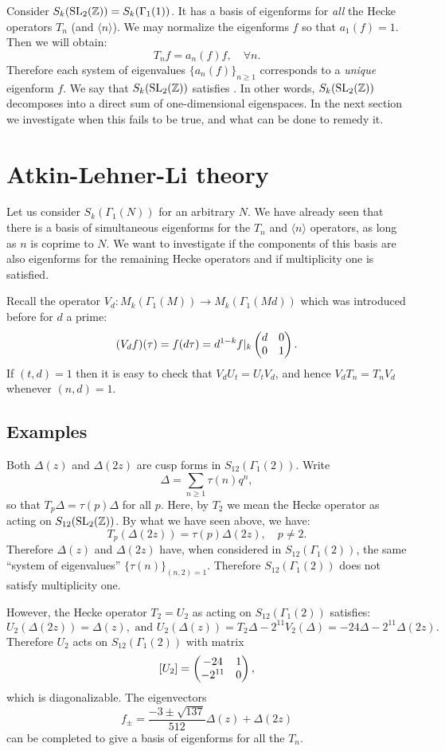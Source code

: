   Consider $S_k(\operatorname{SL}_2(\mathbb{Z})) = S_k(\Gamma_1(1))$. It has a basis of eigenforms for \emph{all} the Hecke operators $T_n$ (and $\langle n\rangle$). We may normalize the eigenforms $f$ so that $a_1(f)=1$. Then we will obtain:
\[
T_n f = a_n(f) f,\quad \forall n.
\]
Therefore each system of eigenvalues $\{a_n(f)\}_{n\geq 1}$ corresponds to a \emph{unique} eigenform $f$. We say that $S_k(\operatorname{SL}_2(\mathbb{Z}))$ satisfies . In other words, $S_k(\operatorname{SL}_2(\mathbb{Z}))$ decomposes into a direct sum of one-dimensional eigenspaces. In the next section we investigate when this fails to be true, and what can be done to remedy it.

\section{Atkin-Lehner-Li theory}
Let us consider $S_k(\Gamma_1(N))$ for an arbitrary $N$. We have already seen that there is a basis of simultaneous eigenforms for the $T_n$ and $\langle n\rangle$ operators, as long as $n$ is coprime to $N$. We want to investigate if the components of this basis are also eigenforms for the remaining Hecke operators and if multiplicity one is satisfied.

Recall the operator $V_d\colon M_k(\Gamma_1(M))\to M_k(\Gamma_1(Md))$ which was introduced before for $d$ a prime:
\[
(V_d f)(\tau) = f(d\tau) = d^{1-k} f|_k\left(\begin{matrix}d&0\\0&1\end{matrix}\right).
\]
If $(t,d)=1$ then it is easy to check that $V_d U_t = U_t V_d$, and hence $V_d T_n = T_n V_d$ whenever $(n,d)=1$.

\subsection{Examples}

  Both $\Delta(z)$ and $\Delta(2z)$ are cusp forms in $S_{12}(\Gamma_1(2))$. Write
\[
\Delta = \sum_{n\geq 1} \tau(n) q^n,
\]
so that $T_p \Delta=\tau(p)\Delta$ for all $p$. Here, by $T_2$ we mean the Hecke operator as acting on $S_{12}(\operatorname{SL}_2(\mathbb{Z}))$. By what we have seen above, we have:
\[
T_p(\Delta(2z)) = \tau(p)\Delta(2z),\quad p\neq 2.
\]
Therefore $\Delta(z)$ and $\Delta(2z)$ have, when considered in $S_{12}(\Gamma_1(2))$, the same ``system of eigenvalues'' $\{\tau(n)\}_{(n,2)=1}$. Therefore $S_{12}(\Gamma_1(2))$ does not satisfy multiplicity one.

However, the Hecke operator $T_2=U_2$ as acting on $S_{12}(\Gamma_1(2))$ satisfies:
\[
U_2(\Delta(2z)) = \Delta(z),\text{ and } U_2(\Delta(z)) = T_2\Delta - 2^{11}V_2(\Delta) = -24\Delta - 2^{11} \Delta(2z).
\]
Therefore $U_2$ acts on $S_{12}(\Gamma_1(2))$ with matrix
\[
[U_2] = \left(\begin{matrix}-24&1\\-2^{11}&0\end{matrix}\right),
\]
which is diagonalizable. The eigenvectors
\[
f_{\pm} = \frac{-3 \pm \sqrt{137}}{512} \Delta(z) + \Delta(2z)
\]
can be completed to give a basis of eigenforms for all the $T_n$.


